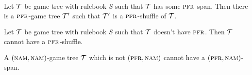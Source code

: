 \begin{proposition}
Let $\mathcal{T}$ be game tree with rulebook $S$ such that $\mathcal{T}$ has some $\textsc{pfr}$-span. Then there is a $\textsc{pfr}$-game tree $\mathcal{T}'$ such that $\mathcal{T}'$ is a $\textsc{pfr}$-shuffle of $\mathcal{T}$.
\end{proposition}

\begin{proposition}
Let $\mathcal{T}$ be game tree with rulebook $S$ such that $\mathcal{T}$ doesn't have $\textsc{pfr}$. Then $\mathcal{T}$ cannot have a $\textsc{pfr}$-shuffle. 
\end{proposition}

\begin{corollary}
A $(\textsc{nam},\textsc{nam})$-game tree $\mathcal{T}$ which is not $(\textsc{pfr},\textsc{nam})$ cannot have a $(\textsc{pfr},\textsc{nam})$-span. 
\end{corollary}
